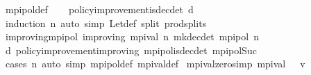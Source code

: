 \begin{isabellebody}
\ mpi{\isacharunderscore}{\kern0pt}pol{\isacharunderscore}{\kern0pt}def\isanewline
\ \ \isamarkupfalse%
\ policy{\isacharunderscore}{\kern0pt}improvement{\isacharunderscore}{\kern0pt}is{\isacharunderscore}{\kern0pt}dec{\isacharunderscore}{\kern0pt}det\ d{}\isanewline
\ \ \isamarkupfalse%
\ {\isacharparenleft}{\kern0pt}induction\ n{\isacharparenright}{\kern0pt}\ {\isacharparenleft}{\kern0pt}auto\ simp{\isacharcolon}{\kern0pt}\ Let{\isacharunderscore}{\kern0pt}def\ split{\isacharcolon}{\kern0pt}\ prod{\isachardot}{\kern0pt}splits{\isacharparenright}{\kern0pt}%
\endisatagproof
{\isafoldproof}%
%
\isadelimproof
\isanewline
%
\endisadelimproof
\isanewline
{}\isamarkupfalse%
\ {\isasymnu}{\isacharunderscore}{\kern0pt}improving{\isacharunderscore}{\kern0pt}mpi{\isacharunderscore}{\kern0pt}pol{\isacharcolon}{\kern0pt}\ {\isachardoublequoteopen}{\isasymnu}{\isacharunderscore}{\kern0pt}improving\ {\isacharparenleft}{\kern0pt}mpi{\isacharunderscore}{\kern0pt}val\ n{\isacharparenright}{\kern0pt}\ {\isacharparenleft}{\kern0pt}mk{\isacharunderscore}{\kern0pt}dec{\isacharunderscore}{\kern0pt}det\ {\isacharparenleft}{\kern0pt}mpi{\isacharunderscore}{\kern0pt}pol\ n{\isacharparenright}{\kern0pt}{\isacharparenright}{\kern0pt}{\isachardoublequoteclose}\isanewline
%
\isadelimproof
\ \ %
\endisadelimproof
%
\isatagproof
{}\isamarkupfalse%
\ d{}\ policy{\isacharunderscore}{\kern0pt}improvement{\isacharunderscore}{\kern0pt}improving\ mpi{\isacharunderscore}{\kern0pt}pol{\isacharunderscore}{\kern0pt}is{\isacharunderscore}{\kern0pt}dec{\isacharunderscore}{\kern0pt}det\ mpi{\isacharunderscore}{\kern0pt}pol{\isacharunderscore}{\kern0pt}Suc\isanewline
\ \ \isamarkupfalse%
\ {\isacharparenleft}{\kern0pt}cases\ n{\isacharparenright}{\kern0pt}\ {\isacharparenleft}{\kern0pt}auto\ simp{\isacharcolon}{\kern0pt}\ mpi{\isacharunderscore}{\kern0pt}pol{\isacharunderscore}{\kern0pt}def\ mpi{\isacharunderscore}{\kern0pt}val{\isacharunderscore}{\kern0pt}def{\isacharparenright}{\kern0pt}%
\endisatagproof
{\isafoldproof}%
%
\isadelimproof
\isanewline
%
\endisadelimproof
\isanewline
{}\isamarkupfalse%
\ mpi{\isacharunderscore}{\kern0pt}val{\isacharunderscore}{\kern0pt}zero{\isacharbrackleft}{\kern0pt}simp{\isacharbrackright}{\kern0pt}{\isacharcolon}{\kern0pt}\ {\isachardoublequoteopen}mpi{\isacharunderscore}{\kern0pt}val\ {}\ {\isacharequal}{\kern0pt}\ v{}{\isachardoublequoteclose}\isanewline
%
\isadelimproof
\ \ %
\endisadelimproof
%
\isatagproof
{}\isamarkupfalse%

\end{isabellebody}

